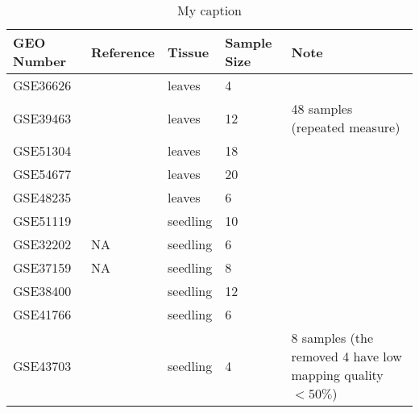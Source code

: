 \documentclass[letterpaper,12pt]{article}
\begin{document}
	
	
	\begin{table}[!ht]
		\small
		\centering
		\caption{My caption}
		\label{my-label}
		\begin{tabular}{p{2.5cm}p{2cm}p{4.5cm}p{1cm}p{5cm}} \\ \hline
			GEO Number & Reference                     & Tissue                                                   & Sample Size & Note                   \\  \hline
			GSE36626   & \cite{wollmann2012dynamic}           & leaves                                                   & 4           &                        \\
			GSE39463   & \cite{maekawa2012conservation}       & leaves                                                   & 12          & 48 samples (repeated measure) \\
			GSE51304   & \cite{stroud2014non}                & leaves                                                   & 18          &                        \\
			GSE54677   & \cite{moissiard2014transcriptional}  & leaves                                                   & 20          &                        \\
			GSE48235   & \cite{liu2014different}              & leaves                                                   & 6           &                        \\  \hline
			GSE51119   & \cite{zhiponova2014helix}            & seedling                                                 & 10          &                        \\
			GSE32202   & NA                            & seedling                                                 & 6           &                        \\
			GSE37159   & NA                            & seedling                                                 & 8           &                        \\
			GSE38400   & \cite{zhu2013swi}                    & seedling                                                 & 12          &                        \\
			GSE41766   & \cite{bai2012triple}                 & seedling                                                 & 6           &                        \\
			GSE43703   & \cite{liu2013translational}          & seedling                                                 & 4           & 8 samples (the removed 4 have low mapping quality $<50\%$)              \\

\end{tabular}
\end{table}
\end{document}

